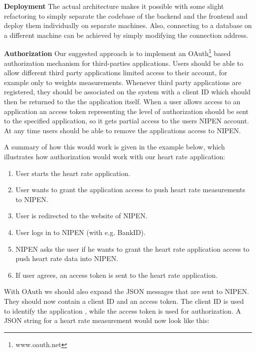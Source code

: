 \textbf{Deployment}
The actual architecture makes it possible with some slight refactoring to simply separate
the codebase of the backend and the frontend and deploy them individually on separate machines.
Also, connecting to a database on a different machine can be achieved by simply
modifying the connection address.

\iffalse \textbf{Authentication} \fi


\textbf{Authorization}
Our suggested approach is to implement an OAuth\footnote{www.oauth.net} based authorization mechanism
for third-parties applications. Users should be able to allow different third party applications limited access
to their account, for example only to weights measurements.
Whenever third party applications are registered, they should be associated on the system with a client ID which
should then be returned to the the application itself.
When a user allows access to an application an access token representing the level of authorization should be sent
to the specified application, so it gets partial access to the users NIPEN account.
At any time users should be able to remove the applications access to NIPEN.

A summary of how this would work is given in the example below, which illustrates how \iffalse the granting of
permission\fi authorization would work with our heart rate application:

\begin{enumerate}
\item User starts the heart rate application.
\item User wants to grant the application access to push heart rate measurements to NIPEN.
\item User is redirected to the website of NIPEN.
\item User logs in to NIPEN (with e.g. BankID).
\item NIPEN asks the user if he wants to grant the heart rate application access to push heart rate data into NIPEN.
\item If user agrees, an access token is sent to the heart rate application.
\end{enumerate}

With OAuth we should also expand the JSON messages that are sent to NIPEN.
They should now contain a client ID and an access token. The client ID is used to identify the application
\iffalse that is pushing values to NIPEN\fi, while the access token
is used for authorization. A JSON string for a heart rate measurement would now look like this:

